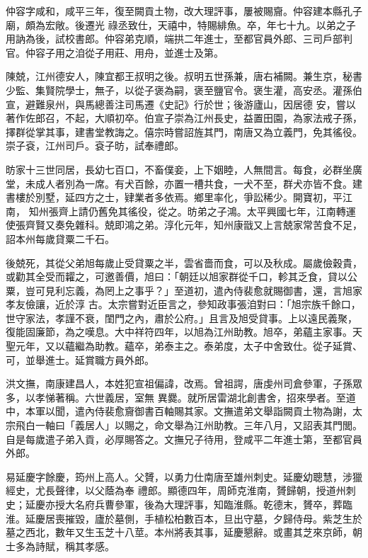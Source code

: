 \begin{pinyinscope}
 仲容字咸和，咸平三年，復至闕貢土物，改大理評事，屢被賜齎。仲容建本縣孔子廟，頗為宏敞。後遷光
 祿丞致仕，天禧中，特賜緋魚。卒，年七十九。以弟之子用訥為後，試校書郎。仲容弟克順，端拱二年進士，至都官員外郎、三司戶部判官。仲容子用之洎從子用莊、用舟，並進士及第。



 陳兢，江州德安人，陳宜都王叔明之後。叔明五世孫兼，唐右補闕。兼生京，秘書少監、集賢院學士，無子，以從子褒為嗣，褒至鹽官令。褒生灌，高安丞。灌孫伯宣，避難泉州，與馬總善注司馬遷《史記》行於世；後游廬山，因居德
 安，嘗以著作佐郎召，不起，大順初卒。伯宣子崇為江州長史，益置田園，為家法戒子孫，擇群從掌其事，建書堂教誨之。僖宗時嘗詔旌其門，南唐又為立義門，免其徭役。崇子袞，江州司戶。袞子昉，試奉禮郎。



 昉家十三世同居，長幼七百口，不畜僕妾，上下姻睦，人無間言。每食，必群坐廣堂，未成人者別為一席。有犬百餘，亦置一槽共食，一犬不至，群犬亦皆不食。建書樓於別墅，延四方之士，肄業者多依焉。鄉里率化，爭訟稀少。開寶初，平江南，
 知州張齊上請仍舊免其徭役，從之。昉弟之子鴻。太平興國七年，江南轉運使張齊賢又奏免雜科。兢即鴻之弟。淳化元年，知州康戩又上言兢家常苦食不足，詔本州每歲貸粟二千石。



 後兢死，其從父弟旭每歲止受貸粟之半，雲省嗇而食，可以及秋成。屬歲儉穀貴，或勸其全受而糶之，可邀善價，旭曰：「朝廷以旭家群從千口，軫其乏食，貸以公粟，豈可見利忘義，為罔上之事乎？」至道初，遣內侍裴愈就賜御書，還，言旭家孝友儉讓，近於淳
 古。太宗嘗對近臣言之，參知政事張洎對曰：「旭宗族千餘口，世守家法，孝謹不衰，閨門之內，肅於公府。」且言及旭受貸事。上以遠民義聚，復能固廉節，為之嘆息。大中祥符四年，以旭為江州助教。旭卒，弟蘊主家事。天聖元年，又以蘊繼為助教。蘊卒，弟泰主之。泰弟度，太子中舍致仕。從子延賞、可，並舉進士。延賞職方員外郎。



 洪文撫，南康建昌人，本姓犯宣祖偏諱，改焉。曾祖諤，唐虔州司倉參軍，子孫眾多，以孝悌著稱。六世義居，室無
 異爨。就所居雷湖北創書舍，招來學者。至道中，本軍以聞，遣內侍裴愈齎御書百軸賜其家。文撫遣弟文舉詣闕貢土物為謝，太宗飛白一軸曰「義居人」以賜之，命文舉為江州助教。三年八月，又詔表其門閭。自是每歲遣子弟入貢，必厚賜答之。文撫兄子待用，登咸平二年進士第，至都官員外郎。



 易延慶字餘慶，筠州上高人。父贇，以勇力仕南唐至雄州刺史。延慶幼聰慧，涉獵經史，尤長聲律，以父蔭為奉
 禮郎。顯德四年，周師克淮南，贇歸朝，授道州刺史；延慶亦授大名府兵曹參軍，後為大理評事，知臨淮縣。乾德末，贇卒，葬臨淮。延慶居喪摧毀，廬於墓側，手植松柏數百本，旦出守墓，夕歸侍母。紫芝生於墓之西北，數年又生玉芝十八莖。本州將表其事，延慶懇辭。或畫其芝來京師，朝士多為詩賦，稱其孝感。




\end{pinyinscope}
